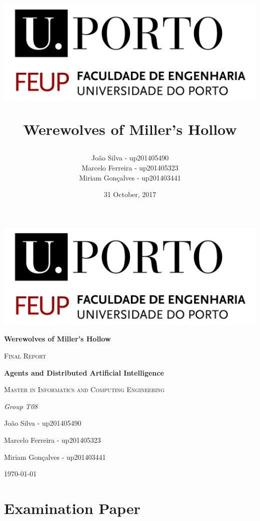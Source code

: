 \documentclass{article}
\title{ \begin{center}
					\includegraphics[scale=0.6]{../images/FEUPlogo}
				\end{center}
				\textbf{Werewolves of Miller's Hollow}}
\author{João Silva - up201405490\\
		Marcelo Ferreira - up201405323\\
		Miriam Gonçalves - up201403441}
\date{31 October, 2017}
\begin{document}
\begin{titlepage}
	\centering
	\includegraphics[width=1\textwidth]{../images/FEUPlogo}\par\vspace{1cm}
	{\huge\bfseries Werewolves of Miller's Hollow \par}
	\vspace{2cm}
	{\scshape\Large Final Report\par}
	\vspace{1.5cm}
	{\large\bfseries Agents and Distributed Artificial Intelligence\par}
	\vspace{0.7cm}
	{\scshape\normalsize  Master in Informatics and Computing Engineering \par}
	\vspace{1.5cm}
	{\Large\itshape Group T08 \par João Silva - up201405490 \par
	Marcelo Ferreira - up201405323 \par
	Miriam Gonçalves - up201403441\par}

	\vfill
	{\large \today\par}
\end{titlepage}
\thispagestyle{empty}

\newpage

\tableofcontents

\newpage

\section{Examination Paper}
\end{document}
